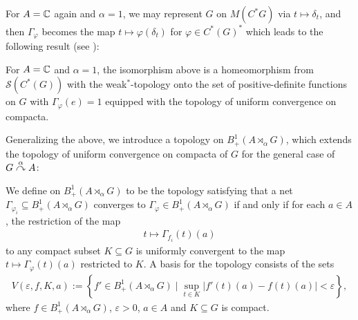 For $A = \mathbb{C}$ again and $\alpha = 1$, we may represent $G$ on $M(C^*G)$ via $t \mapsto \delta_t$, and then $\Gamma_\varphi$ becomes the map $t \mapsto \varphi(\delta_t)$ for $ \varphi \in C^*(G)^*$ which leads to the following result (see \cite[7.1.11]{pedersenalgauto}):
\begin{proposition}
For $A= \mathbb{C}$ and $\alpha = 1$, the isomorphism above is a homeomorphism from $\mathcal{S}(C^*(G))$ with the weak$^*$-topology onto the set of positive-definite functions on $G$ with $\Gamma_\varphi(e)=1$ equipped with the topology of uniform convergence on compacta.
\label{mult:OGstatehomeo}
\end{proposition}

Generalizing the above, we introduce a topology on $B_+^1(A \rtimes_\alpha G)$, which extends the topology of uniform convergence on compacta of $G$ for the general case of $G \stackrel{\alpha}{\curvearrowright} A$:
\begin{definition}
We define  on $B_+^1(A \rtimes_\alpha G)$ to be the topology satisfying that a net $\Gamma_{\varphi_i} \subseteq B_+^1(A \rtimes_\alpha G)$ converges to $\Gamma_{\varphi} \in B_+^1(A \rtimes_\alpha G)$ if and only if for each $a \in A$, the restriction of the map
\begin{align*}
	t \mapsto \Gamma_{f_i}(t)(a)
\end{align*}
to any compact subset $K \subseteq G$ is uniformly convergent to the map $t \mapsto \Gamma_\varphi(t)(a)$ restricted to $K$. A basis for the topology consists of the sets
\begin{align*}
	V(\varepsilon, f, K, a) :=\left\{ f' \in B_+^1(A \rtimes_\alpha G) \mid \sup_{t \in K}| f'(t)(a) - f(t)(a) | < \varepsilon \right\},
\end{align*}
where $f \in B_{+}^1(A \rtimes_\alpha G)$, $\varepsilon > 0$, $a \in A$ and $K \subseteq G$ is compact.
\end{definition}

